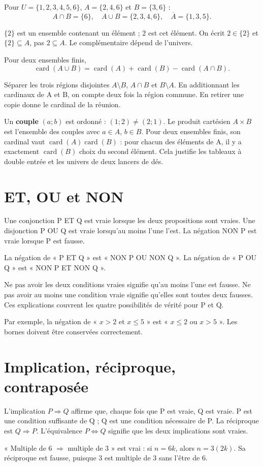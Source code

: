 \documentclass[../cours_2de.tex]{subfiles}
\begin{document}
Pour $U=\{1,2,3,4,5,6\}$, $A=\{2,4,6\}$ et $B=\{3,6\}$ :
\[
A\cap B=\{6\},\quad A\cup B=\{2,3,4,6\},\quad \overline A=\{1,3,5\}.
\]
\begin{attention}
$\{2\}$ est un ensemble contenant un élément ; $2$ est cet élément. On écrit $2\in\{2\}$ et $\{2\}\subseteq A$, pas $2\subseteq A$. Le complémentaire dépend de l'univers.
\end{attention}
\begin{propriete}
Pour deux ensembles finis,
\[
\operatorname{card}(A\cup B)=\operatorname{card}(A)+\operatorname{card}(B)-\operatorname{card}(A\cap B).
\]
\end{propriete}
\begin{demonstration}
Séparer les trois régions disjointes $A\setminus B$, $A\cap B$ et $B\setminus A$. En additionnant les cardinaux de A et B, on compte deux fois la région commune. En retirer une copie donne le cardinal de la réunion.
\end{demonstration}
Un \textbf{couple} $(a;b)$ est ordonné : $(1;2)\ne(2;1)$. Le produit cartésien $A\times B$ est l'ensemble des couples avec $a\in A$, $b\in B$. Pour deux ensembles finis, son cardinal vaut $\operatorname{card}(A)\operatorname{card}(B)$ : pour chacun des éléments de A, il y a exactement $\operatorname{card}(B)$ choix du second élément. Cela justifie les tableaux à double entrée et les univers de deux lancers de dés.
\section{ET, OU et NON}
Une conjonction P ET Q est vraie lorsque les deux propositions sont vraies. Une disjonction P OU Q est vraie lorsqu'au moins l'une l'est. La négation NON P est vraie lorsque P est fausse.
\begin{propriete}
La négation de « P ET Q » est « NON P OU NON Q ». La négation de « P OU Q » est « NON P ET NON Q ».
\end{propriete}
\begin{demonstration}
Ne pas avoir les deux conditions vraies signifie qu'au moins l'une est fausse. Ne pas avoir au moins une condition vraie signifie qu'elles sont toutes deux fausses. Ces explications couvrent les quatre possibilités de vérité pour P et Q.
\end{demonstration}
Par exemple, la négation de « $x>2$ et $x\le5$ » est « $x\le2$ ou $x>5$ ». Les bornes doivent être conservées correctement.
\section{Implication, réciproque, contraposée}
\begin{definition}
L'implication $P\Rightarrow Q$ affirme que, chaque fois que P est vraie, Q est vraie. P est une condition suffisante de Q ; Q est une condition nécessaire de P. La réciproque est $Q\Rightarrow P$. L'équivalence $P\Leftrightarrow Q$ signifie que les deux implications sont vraies.
\end{definition}
« Multiple de $6$ $\Rightarrow$ multiple de $3$ » est vrai : si $n=6k$, alors $n=3(2k)$. Sa réciproque est fausse, puisque $3$ est multiple de $3$ sans l'être de $6$.
\end{document}
